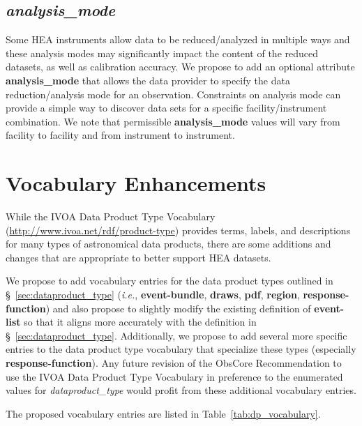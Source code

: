 \documentclass[11pt,a4paper]{ivoa}
\begin{document}
\subsection{{\em analysis\_mode}}

Some HEA instruments allow data to be reduced/analyzed in multiple ways and these analysis modes may significantly impact the content of the reduced datasets, as well as calibration accuracy.  We propose to add an optional attribute {\bf analysis\_mode} that allows the data provider to specify the data reduction/analysis mode for an observation.  Constraints on analysis mode can provide a simple way to discover data sets for a specific facility/instrument combination.  We note that permissible {\bf analysis\_mode} values will vary from facility to facility and from instrument to instrument.

\section{Vocabulary Enhancements}

While the IVOA Data Product Type Vocabulary (\url{http://www.ivoa.net/rdf/product-type}) provides terms, labels, and descriptions for many types of astronomical data products, there are some additions and changes that are appropriate to better support HEA datasets.

We propose to add vocabulary entries for the data product types outlined in \S~\ref{sec:dataproduct_type} ({\em i.e.\/}, {\bf event-bundle}, {\bf draws}, {\bf pdf}, {\bf region}, {\bf response-function}) and also propose to slightly modify the existing definition of {\bf event-list} so that it aligns more accurately with the definition in \S~\ref{sec:dataproduct_type}.  Additionally, we propose to add several more specific entries to the data product type vocabulary that specialize these types (especially {\bf response-function}).  Any future revision of the ObsCore Recommendation to use the IVOA Data Product Type Vocabulary in preference to the enumerated values for {\em dataproduct\_type\/} would profit from these additional vocabulary entries.

The proposed vocabulary entries are listed in Table~\ref{tab:dp_vocabulary}.
\end{document}

